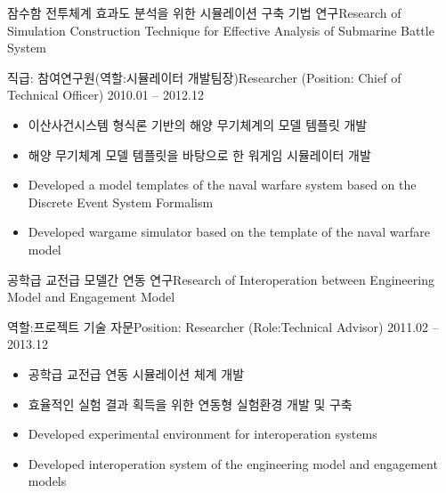 \documentclass[english,representative]{resume_structure}
\begin{document}
\begin{Project}
{잠수함 전투체계 효과도 분석을 위한 시뮬레이션 구축 기법 연구}{Research of Simulation Construction Technique for Effective Analysis of Submarine Battle System}
{}{} 
{
\ResumeSubSection %
    {직급: 참여연구원(역할:시뮬레이터 개발팀장)}{Researcher (Position: Chief of Technical Officer)}
    {2010.01 -- 2012.12}
    {
      \begin{itemize}
       \item 이산사건시스템 형식론 기반의 해양 무기체계의 모델 템플릿 개발
       \item 해양 무기체계 모델 템플릿을 바탕으로 한 워게임 시뮬레이터 개발
      \end{itemize}
    }
    {
      \begin{itemize}
        \item Developed a model templates of the naval warfare system based on the Discrete Event System Formalism
        \item Developed wargame simulator based on the template of the naval warfare model
     \end{itemize}
    }
}

{공학급 교전급 모델간 연동 연구}{Research of Interoperation between Engineering Model and Engagement Model}
{}{} 
{
\ResumeSubSection %
    {역할:프로젝트 기술 자문}{Position: Researcher (Role:Technical Advisor)}
    {2011.02 -- 2013.12}
    {
      \begin{itemize}
        \item 공학급 교전급 연동 시뮬레이션 체계 개발
        \item 효율적인 실험 결과 획득을 위한 연동형 실험환경 개발 및 구축
      \end{itemize}
   }
    {
      \begin{itemize}
       \item Developed experimental environment for interoperation systems
       \item Developed interoperation system of the engineering model and engagement models
      \end{itemize}
    }
}


\end{Project}
\end{document}
